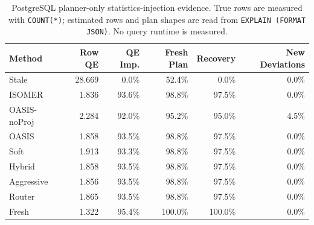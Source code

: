 \begin{table}[t]
  \centering
  \small
  \caption{PostgreSQL planner-only statistics-injection evidence. True rows are measured with \texttt{COUNT(*)}; estimated rows and plan shapes are read from \texttt{EXPLAIN (FORMAT JSON)}. No query runtime is measured.}
  \label{tab:postgres_planner_stats_injection}
  \setlength{\tabcolsep}{4pt}
  \begin{tabular}{lrrrrr}
    \toprule
    Method & Row QE & QE Imp. & Fresh Plan & Recovery & New Deviations \\
    \midrule
    Stale & 28.669 & 0.0\% & 52.4\% & 0.0\% & 0.0\% \\
    ISOMER & 1.836 & 93.6\% & 98.8\% & 97.5\% & 0.0\% \\
    OASIS-noProj & 2.284 & 92.0\% & 95.2\% & 95.0\% & 4.5\% \\
    OASIS & 1.858 & 93.5\% & 98.8\% & 97.5\% & 0.0\% \\
    Soft & 1.913 & 93.3\% & 98.8\% & 97.5\% & 0.0\% \\
    Hybrid & 1.858 & 93.5\% & 98.8\% & 97.5\% & 0.0\% \\
    Aggressive & 1.856 & 93.5\% & 98.8\% & 97.5\% & 0.0\% \\
    Router & 1.865 & 93.5\% & 98.8\% & 97.5\% & 0.0\% \\
    Fresh & 1.322 & 95.4\% & 100.0\% & 100.0\% & 0.0\% \\
    \bottomrule
  \end{tabular}
\end{table}
